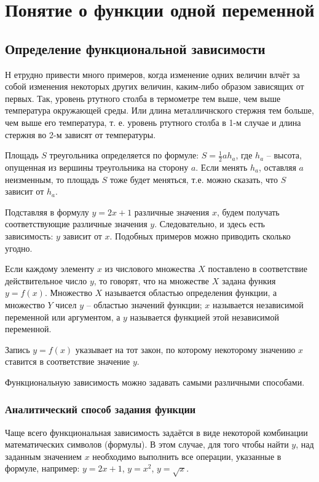 \chapter{Понятие о функции одной переменной}
\section{Определение функциональной зависимости}
\lettrine[lines=3]{Н}{}
етрудно привести много примеров, когда изменение одних величин влчёт за собой
изменения некоторых других величин, каким-либо образом зависящих от первых.
Так, уровень ртутного столба в термометре тем выше, чем выше температура
окружающей среды. Или длина металличнского стержня тем больше, чем выше его
температура, т. е. уровень ртутного столба в 1-м случае и длина стержня во 2-м
зависят от температуры.

Площадь $S$ треугольника определяется по формуле: $S = \frac{1}{2}ah_a$, где
$h_a$ -- высота, опущенная из вершины треугольника на сторону $a$. Если менять
$h_a$, оставляя $a$ неизменным, то площадь $S$ тоже будет меняться, т.е. можно
сказать, что $S$ зависит от $h_a$.

Подставляя в формулу $y = 2x + 1$ различные значения $x$, будем получать
соответствующие различные значения $y$. Следовательно, и здесь есть
зависимость: $y$ зависит от $x$. Подобных примеров можно приводить сколько
угодно.

\begin{definition}
	Если каждому элементу $x$ из числового множества $X$ поставлено в
	соответствие действительное число $y$, то говорят, что на множестве $X$
	задана функия $y = f(x)$. Множество $X$ называется областью определения
	функции, а множество $Y$ чисел $y$ -- областью значений функции; $x$
	называется независимой переменной или аргументом, а $y$ называется
	функцией этой независимой переменной.
\end{definition}

Запись $y = f(x)$ указывает на тот закон, по которому некоторому значению $x$
ставится в соответствие значение $y$.

Функциональную зависимость можно задавать самыми различными способами.

\subsection{Аналитический способ задания функции}
Чаще всего функциональная зависимость задаётся в виде некоторой комбинации
математических символов (формулы). В этом случае, для того чтобы найти $y$, над
заданным значением $x$ необходимо выполнить все операции, указанные в формуле,
например: $y = 2x + 1$, $y = x^2$, $y = \sqrt{x}$.

